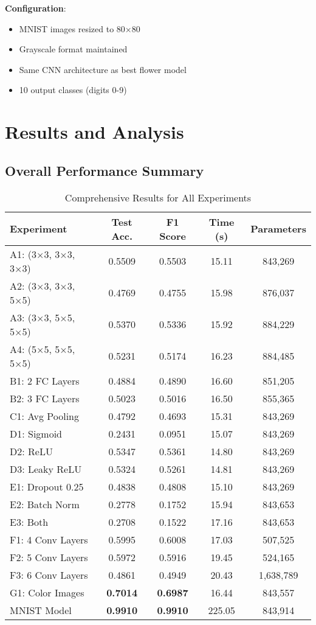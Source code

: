 \documentclass[12pt,a4paper]{article}
\begin{document}
\textbf{Configuration}: 
\begin{itemize}
    \item MNIST images resized to 80×80
    \item Grayscale format maintained
    \item Same CNN architecture as best flower model
    \item 10 output classes (digits 0-9)
\end{itemize}

\section{Results and Analysis}

\subsection{Overall Performance Summary}

\begin{table}[H]
\centering
\caption{Comprehensive Results for All Experiments}
\small
\begin{tabular}{lcccc}
\toprule
\textbf{Experiment} & \textbf{Test Acc.} & \textbf{F1 Score} & \textbf{Time (s)} & \textbf{Parameters} \\
\midrule
A1: (3×3, 3×3, 3×3) & 0.5509 & 0.5503 & 15.11 & 843,269 \\
A2: (3×3, 3×3, 5×5) & 0.4769 & 0.4755 & 15.98 & 876,037 \\
A3: (3×3, 5×5, 5×5) & 0.5370 & 0.5336 & 15.92 & 884,229 \\
A4: (5×5, 5×5, 5×5) & 0.5231 & 0.5174 & 16.23 & 884,485 \\
\midrule
B1: 2 FC Layers & 0.4884 & 0.4890 & 16.60 & 851,205 \\
B2: 3 FC Layers & 0.5023 & 0.5016 & 16.50 & 855,365 \\
\midrule
C1: Avg Pooling & 0.4792 & 0.4693 & 15.31 & 843,269 \\
\midrule
D1: Sigmoid & 0.2431 & 0.0951 & 15.07 & 843,269 \\
D2: ReLU & 0.5347 & 0.5361 & 14.80 & 843,269 \\
D3: Leaky ReLU & 0.5324 & 0.5261 & 14.81 & 843,269 \\
\midrule
E1: Dropout 0.25 & 0.4838 & 0.4808 & 15.10 & 843,269 \\
E2: Batch Norm & 0.2778 & 0.1752 & 15.94 & 843,653 \\
E3: Both & 0.2708 & 0.1522 & 17.16 & 843,653 \\
\midrule
F1: 4 Conv Layers & 0.5995 & 0.6008 & 17.03 & 507,525 \\
F2: 5 Conv Layers & 0.5972 & 0.5916 & 19.45 & 524,165 \\
F3: 6 Conv Layers & 0.4861 & 0.4949 & 20.43 & 1,638,789 \\
\midrule
G1: Color Images & \textbf{0.7014} & \textbf{0.6987} & 16.44 & 843,557 \\
\midrule
MNIST Model & \textbf{0.9910} & \textbf{0.9910} & 225.05 & 843,914 \\
\bottomrule
\end{tabular}
\end{table}
\end{document}
